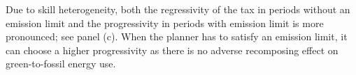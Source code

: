 Due to skill heterogeneity, both the regressivity of the tax in periods without an emission limit and the progressivity in periods with emission limit is more pronounced; see panel (c). When the planner has to satisfy an emission limit, it can choose a higher progressivity as there is no adverse recomposing effect on green-to-fossil energy use.  

